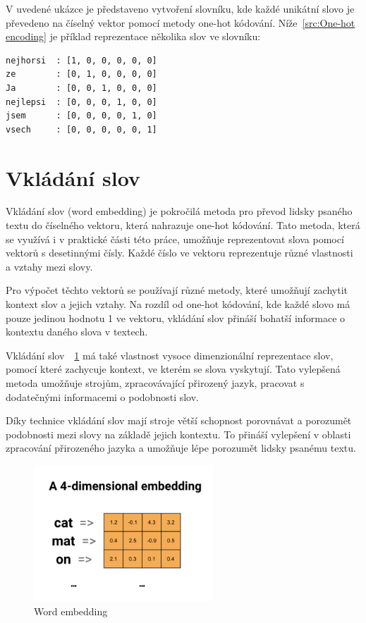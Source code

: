 V uvedené ukázce je představeno vytvoření slovníku, kde každé unikátní slovo je převedeno na číselný vektor pomocí metody one-hot kódování.
Níže~\ref{src:One-hot encoding} je příklad reprezentace několika slov ve slovníku:

\begin{lstlisting}[label=src:One-hot encoding,caption={One-hot kódování prezentace výsledného formátu dat}]
nejhorsi  : [1, 0, 0, 0, 0, 0]
ze        : [0, 1, 0, 0, 0, 0]
Ja        : [0, 0, 1, 0, 0, 0]
nejlepsi  : [0, 0, 0, 1, 0, 0]
jsem      : [0, 0, 0, 0, 1, 0]
vsech     : [0, 0, 0, 0, 0, 1]
\end{lstlisting}

\section{Vkládání slov}
Vkládání slov (word embedding) je pokročilá metoda pro převod lidsky psaného textu do číselného vektoru, která nahrazuje one-hot kódování. Tato metoda, která se využívá i v praktické části této práce, umožňuje reprezentovat slova pomocí vektorů s desetinnými čísly. Každé číslo ve vektoru reprezentuje různé vlastnosti a vztahy mezi slovy.

Pro výpočet těchto vektorů se používají různé metody, které umožňují zachytit kontext slov a jejich vztahy.
Na rozdíl od one-hot kódování, kde každé slovo má pouze jedinou hodnotu 1 ve vektoru, vkládání slov přináší bohatší informace o kontextu daného slova v textech.

Vkládání slov~\cite{link5}~\ref{fig:Word embedding} má také vlastnost vysoce dimenzionální reprezentace slov, pomocí které zachycuje kontext, ve kterém se slova vyskytují.
Tato vylepšená metoda umožňuje strojům, zpracovávající přirozený jazyk, pracovat s dodatečnými informacemi o podobnosti slov.

Díky technice vkládání slov mají stroje větší schopnost porovnávat a porozumět podobnosti mezi slovy na základě jejich kontextu. To přináší vylepšení v oblasti zpracování přirozeného jazyka a umožňuje lépe porozumět lidsky psanému textu.

\begin{figure}[H]
	\centering
	\includegraphics[width=0.6\textwidth]{Figures/embedding2.png}
	\caption{Word embedding~\cite{link5}}\label{fig:Word embedding}
\end{figure}

